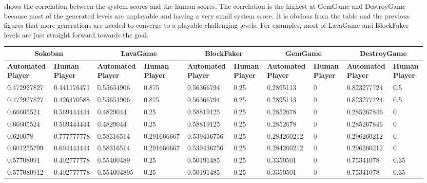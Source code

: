  shows the correlation between the system scores and the human scores. The correlation is the highest at GemGame and DestroyGame because most of the generated levels are unplayable and having a very small system score. It is obvious from the table and the previous figures that more generations are needed to converge to a playable challenging levels. For examples, most of LavaGame and BlockFaker levels are just straight forward towards the goal.

\begin{landscape}
\begin{table}[!ht]
	\centering
	\begin{tabular}{|p{0.8in}|p{0.8in}|p{0.8in}|p{0.8in}|p{0.8in}|p{0.8in}|p{0.8in}|p{0.8in}|p{0.8in}|p{0.8in}|}
		\hline
		\multicolumn{2}{c}{\textbf{Sokoban}} & \multicolumn{2}{c}{\textbf{LavaGame}} & \multicolumn{2}{c}{\textbf{\textbf{BlockFaker}}} & \multicolumn{2}{c}{\textbf{GemGame}} & \multicolumn{2}{c}{\textbf{DestroyGame}}\\
		\hline
		\textbf{Automated Player} & \textbf{Human Player} & \textbf{Automated Player} & \textbf{Human Player} & \textbf{Automated Player} & \textbf{Human Player} & \textbf{Automated Player} & \textbf{Human Player} & \textbf{Automated Player} & \textbf{Human Player}\\
		\hline
		0.472927827 & 0.441176471 & 0.55654906 & 0.875 & 0.56366794 & 0.25 & 0.2895113 & 0 & 0.823277724 & 0.5\\
		\hline
		0.472927827 & 0.426470588 & 0.55654906 & 0.875 & 0.56366794 & 0.25 & 0.2895113 & 0 & 0.823277724 & 0.5\\
		\hline
		0.66605524 & 0.569444444 & 0.4829044 & 0.25 & 0.58819125 & 0.25 & 0.2852678 & 0 & 0.285267846 & 0\\
		\hline
		0.66605524 & 0.569444444 & 0.4829044 & 0.25 & 0.58819125 & 0.25 & 0.2852678 & 0 & 0.285267846 & 0\\
		\hline
		0.620078 & 0.777777778 & 0.58316514 & 0.291666667 & 0.539436756 & 0.25 & 0.284260212 & 0 & 0.296260212 & 0\\
		\hline
		0.601255799 & 0.694444444 & 0.58316514 & 0.291666667 & 0.539436756 & 0.25 & 0.284260212 & 0 & 0.296260212 & 0\\
		\hline
		0.57708091 & 0.402777778 & 0.55400489 & 0.25 & 0.50191485 & 0.25 & 0.3350501 & 0 & 0.75341078 & 0.35\\
		\hline
		0.577080912 & 0.402777778 & 0.554004895 & 0.25 & 0.50191485 & 0.25 & 0.3350501 & 0 & 0.75341078 & 0.35\\

\end{tabular}
\end{table}
\end{landscape}
